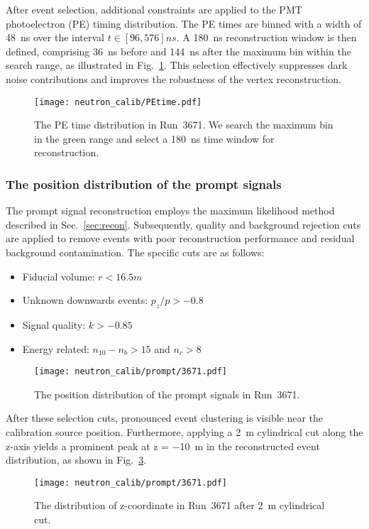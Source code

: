 After event selection, additional constraints are applied to the PMT photoelectron (PE) timing distribution.
The PE times are binned with a width of \SI{48}{ns} over the interval $t \in [96,576]\si{ns}$.
A \SI{180}{ns} reconstruction window is then defined, comprising \SI{36}{ns} before and \SI{144}{ns} after the maximum bin within the search range, as illustrated in Fig.~\ref{fig:PEtime}.
This selection effectively suppresses dark noise contributions and improves the robustness of the vertex reconstruction.
\begin{figure}[h]
	\centering
	\texttt{[image: neutron\_calib/PEtime.pdf]}
	\caption{The PE time distribution in Run~3671. We search the maximum bin in the green range and select a \SI{180}{ns} time window for reconstruction.}
	\label{fig:PEtime}
\end{figure}

\subsubsection{The position distribution of the prompt signals}
The prompt signal reconstruction employs the maximum likelihood method described in Sec.~\ref{sec:recon}.
Subsequently, quality and background rejection cuts are applied to remove events with poor reconstruction performance and residual background contamination. The specific cuts are as follows:
\begin{itemize}
	\item Fiducial volume: $r<16.5\si{m}$
	\item Unknown downwards events: $p_z/p>-0.8$
	\item Signal quality: $k>-0.85$
	\item Energy related: $n_{10}-n_{b}>15$ and $n_c>8$
\end{itemize}

\begin{figure}[h]
	\centering
	\texttt{[image: neutron\_calib/prompt/3671.pdf]}
	\caption{The position distribution of the prompt signals in Run~3671.}
	\label{fig:positionPrompt}
\end{figure}
After these selection cuts, pronounced event clustering is visible near the calibration source position.
Furthermore, applying a \SI{2}{m} cylindrical cut along the z-axis yields a prominent peak at z = \SI{-10}{m} in the reconstructed event distribution, as shown in Fig.~\ref{fig:positionPrompt_z}.
\begin{figure}[h]
	\centering
	\texttt{[image: neutron\_calib/prompt/3671.pdf]}
	\caption{The distribution of z-coordinate in Run~3671 after \SI{2}{m} cylindrical cut.}
	\label{fig:positionPrompt_z}
\end{figure}

